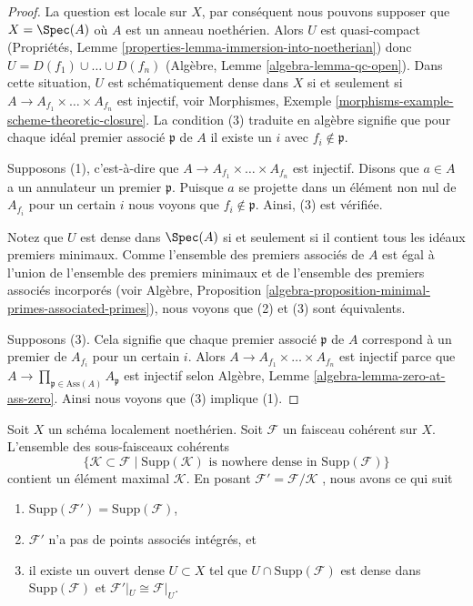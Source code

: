 \begin{proof}
La question est locale sur  $X$, par conséquent nous pouvons supposer que
 $X = \Spec(A)$  où  $A$  est un anneau noethérien. Alors  $U$  est
quasi-compact (Propriétés, Lemme  \ref{properties-lemma-immersion-into-noetherian}) donc  $U = D(f_1) \cup \ldots \cup D(f_n)$  (Algèbre, Lemme
 \ref{algebra-lemma-qc-open}). Dans cette situation,  $U$  est schématiquement dense dans
 $X$  si et seulement si  $A \to A_{f_1} \times \ldots \times A_{f_n}$  est injectif, voir Morphismes,
Exemple  \ref{morphisms-example-scheme-theoretic-closure}. La condition (3) traduite en algèbre signifie que pour
chaque idéal premier associé  $\mathfrak p$  de  $A$  il existe un
 $i$  avec  $f_i \not \in \mathfrak p$.

\medskip\noindent
Supposons (1), c'est-à-dire que  $A \to A_{f_1} \times \ldots \times A_{f_n}$  est injectif. Disons que  $a \in A$ 
a un annulateur un premier  $\mathfrak p$. Puisque  $a$  se projette dans un
élément non nul de  $A_{f_i}$  pour un certain  $i$  nous voyons que
 $f_i \not \in \mathfrak p$. Ainsi, (3) est vérifiée.

\medskip\noindent
Notez que  $U$  est dense dans  $\Spec(A)$  si et seulement si il contient
tous les idéaux premiers minimaux. Comme l'ensemble des premiers associés de
 $A$  est égal à l'union de l'ensemble des premiers minimaux et de
l'ensemble des premiers associés incorporés (voir Algèbre, Proposition
 \ref{algebra-proposition-minimal-primes-associated-primes}), nous voyons que (2) et (3) sont équivalents.

\medskip\noindent
Supposons (3). Cela signifie que chaque premier associé  $\mathfrak p$  de
 $A$  correspond à un premier de  $A_{f_i}$  pour un certain  $i$.
Alors  $A \to A_{f_1} \times \ldots \times A_{f_n}$  est injectif parce que  $A \to \prod_{\mathfrak p \in \text{Ass}(A)} A_\mathfrak p$  est injectif selon Algèbre,
Lemme  \ref{algebra-lemma-zero-at-ass-zero}. Ainsi nous voyons que (3) implique (1).
\end{proof}

\begin{lemma}
\label{lemma-remove-embedded-points}
Soit  $X$  un schéma localement noethérien. Soit  $\mathcal{F}$  un faisceau
cohérent sur  $X$. L'ensemble des sous-faisceaux cohérents
$$
\{
\mathcal{K} \subset \mathcal{F}
\mid
\text{Supp}(\mathcal{K})\text{ is nowhere dense in }\text{Supp}(\mathcal{F})
\}
$$
contient un élément maximal  $\mathcal{K}$. En posant  $\mathcal{F}' = \mathcal{F}/\mathcal{K}$ , nous avons ce
qui suit
\begin{enumerate}
\item $\text{Supp}(\mathcal{F}') = \text{Supp}(\mathcal{F})$,
\item $\mathcal{F}'$  n’a pas de points associés intégrés, et
\item il existe un ouvert dense  $U \subset X$  tel que  $U \cap \text{Supp}(\mathcal{F})$  est dense dans
 $\text{Supp}(\mathcal{F})$  et  $\mathcal{F}'|_U \cong \mathcal{F}|_U$.
\end{enumerate}
\end{lemma}

